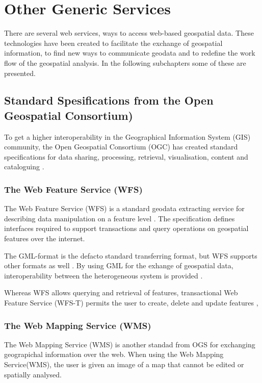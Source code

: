 \section{Other Generic Services}
There are several web services, ways to access web-based geospatial data. These technologies have been created to facilitate the exchange of geospatial information, to find new ways to communicate geodata and to redefine the work flow of the geospatial analysis. In the following subchapters some of these are presented.  

\subsection{Standard Spesifications from the Open Geospatial Consortium)}\label{OGC}
To get a higher interoperability in the Geographical Information System (GIS) community, the Open Geospatial Consortium (OGC) has created standard specifications for data sharing, processing, retrieval, visualisation, content and cataloguing \citep{giuliani2013}.

\subsubsection{The Web Feature Service (WFS)}\label{wfs}

The Web Feature Service (WFS) is a standard geodata extracting service for describing data manipulation on a feature level \citep{Peng2005, Norgedigitalt2014}. The specification defines interfaces required to support transactions and query operations on geospatial features over the internet.

The GML-format is the defacto standard transferring format, but WFS supports other formats as well \citep{Eggan2017}. By using GML for the exhange of geospatial data,  interoperability between the heterogeneous system is provided \citep{YaoXiaobai2008Iimo}.

Whereas WFS allows querying and retrieval of features, transactional Web Feature Service (WFS-T) permits the user to create, delete and update features \citep{OGCNetwork},

\subsubsection{The Web Mapping Service (WMS)}
The Web Mapping Service (WMS) is another standad from OGS for exchanging geograpichal information over the web. When using the Web Mapping Service(WMS), the user is given an image of a map that cannot be edited or spatially analysed. 	


